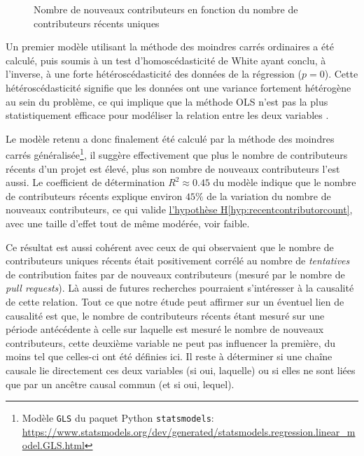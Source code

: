 \documentclass[dvipsnames]{llncs}
\newcommand{\en}[1]{\foreignlanguage{english}{\todo{fix weird hspace}\emph{#1}}}
\begin{document}
\begin{figure}
        

        

        \caption{Nombre de nouveaux contributeurs en fonction du nombre de contributeurs récents uniques}
        \label{fig:contributorCount}
    \end{figure}

    Un premier modèle utilisant la méthode des moindres carrés ordinaires a été calculé, puis soumis à un test
    d'homoscédasticité de White ayant conclu, à l'inverse, à une forte hétéroscédasticité des données de la
    régression ($p = 0$). Cette hétéroscédasticité signifie que les données ont une variance fortement
    hétérogène au sein du problème, ce qui implique que la méthode OLS n'est pas la plus statistiquement
    efficace pour modéliser la relation entre les deux variables \parencite{GLS-2021}.

    Le modèle retenu a donc finalement été calculé par la méthode des moindres carrés
    généralisée\footnote{Modèle \texttt{GLS} du paquet Python \texttt{statsmodels}:
    \url{https://www.statsmodels.org/dev/generated/statsmodels.regression.linear_model.GLS.html}}, il suggère
    effectivement que plus le nombre de contributeurs récents d'un projet est élevé, plus son nombre de
    nouveaux contributeurs l'est aussi. Le coefficient de détermination $R^2 \approx 0.45$ du modèle indique
    que le nombre de contributeurs récents explique environ $45\%$ de la variation du nombre de nouveaux
    contributeurs, ce qui valide \hyperref[hyp:recentcontributorcount]{l'hypothèse
    H\ref*{hyp:recentcontributorcount}}, avec une taille d'effet tout de même modérée, voir faible.

    Ce résultat est aussi cohérent avec ceux de \textcite[p.~12-13,16]{signals-2019} qui observaient que le
    nombre de contributeurs uniques récents était positivement corrélé au nombre de \emph{tentatives} de
    contribution faites par de nouveaux contributeurs (mesuré par le nombre de \en{pull requests}). Là aussi
    de futures recherches pourraient s'intéresser à la causalité de cette relation. Tout ce que notre étude
    peut affirmer sur un éventuel lien de causalité est que, le nombre de contributeurs récents étant mesuré
    sur une période antécédente à celle sur laquelle est mesuré le nombre de nouveaux contributeurs, cette
    deuxième variable ne peut pas influencer la première, du moins tel que celles-ci ont été définies ici. Il
    reste à déterminer si une chaîne causale lie directement ces deux variables (si oui, laquelle) ou si elles
    ne sont liées que par un ancêtre causal commun (et si oui, lequel).
\end{document}
